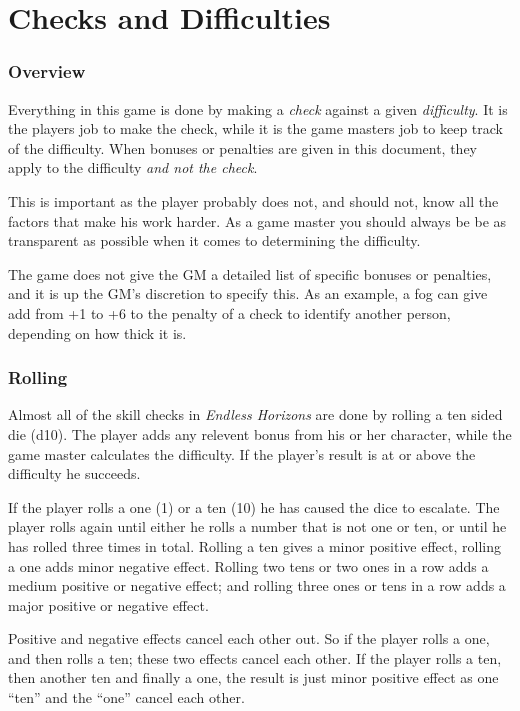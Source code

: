 \chapter{Checks and Difficulties}

\subsection{Overview}

Everything in this game is done by making a \emph{check} against a given
\emph{difficulty}. It is the players job to make the check, while it is the
game masters job to keep track of the difficulty. When bonuses or penalties
are given in this document, they apply to the difficulty \emph{and not the
  check}.

This is important as the player probably does not, and should not, know all
the factors that make his work harder. As a game master you should always be
be as transparent as possible when it comes to determining the difficulty.

The game does not give the GM a detailed list of specific bonuses or penalties,
and it is up the GM's discretion to specify this. As an example, a fog can give
add from +1 to +6 to the penalty of a check to identify another person,
depending on how thick it is.

\subsection{Rolling}

Almost all of the skill checks in \emph{Endless Horizons} are done by rolling
a ten sided die (d10). The player adds any relevent bonus from his or her
character, while the game master calculates the difficulty. If the player's
result is at or above the difficulty he succeeds.

If the player rolls a one (1) or a ten (10) he has caused the dice to escalate.
The player rolls again until either he rolls a number that is not one or ten,
or until he has rolled three times in total. Rolling a ten gives a minor
positive effect, rolling a one adds minor negative effect. Rolling two tens or
two ones in a row adds a medium positive or negative effect; and rolling three
ones or tens in a row adds a major positive or negative effect.

Positive and negative effects cancel each other out. So if the player rolls a
one, and then rolls a ten; these two effects cancel each other. If the player
rolls a ten, then another ten and finally a one, the result is just minor
positive effect as one ``ten'' and the ``one'' cancel each other.

